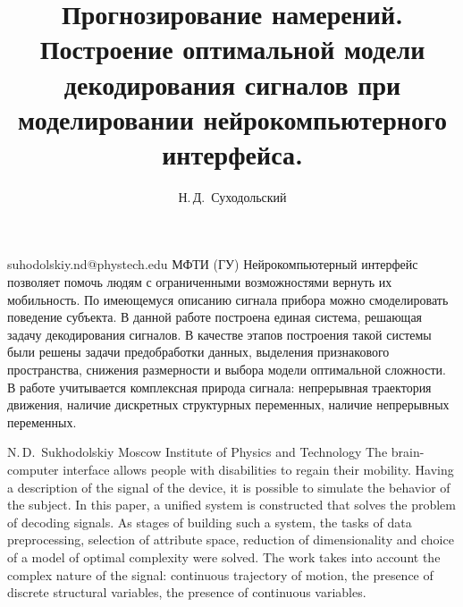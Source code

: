 \documentclass[12pt,twoside]{article}
\begin{document}
\title
    {Прогнозирование намерений. Построение оптимальной модели декодирования сигналов при моделировании нейрокомпьютерного интерфейса.}
\author
    {Н.\,Д.~Суходольский} 
\email
    {suhodolskiy.nd@phystech.edu}
\organization
    {МФТИ (ГУ)}
\abstract
    {Нейрокомпьютерный интерфейс позволяет помочь людям с ограниченными возможностями вернуть их мобильность. По имеющемуся описанию сигнала прибора можно смоделировать поведение субъекта. В данной работе построена единая система, решающая задачу декодирования сигналов. В качестве этапов построения такой системы были решены задачи предобработки данных, выделения признакового пространства, снижения размерности и выбора модели оптимальной сложности. В работе учитывается комплексная природа сигнала: непрерывная траектория движения, наличие дискретных структурных переменных, наличие непрерывных переменных.}

\authorEng
		{N.\,D.~Sukhodolskiy}
\organizationEng
		{Moscow Institute of Physics and Technology}
\abstractEng
		{The brain-computer interface allows people with disabilities to regain their mobility. Having a description of the signal of the device, it is possible to simulate the behavior of the subject. In this paper, a unified system is constructed that solves the problem of decoding signals. As stages of building such a system, the tasks of data preprocessing, selection of attribute space, reduction of dimensionality and choice of a model of optimal complexity were solved. The work takes into account the complex nature of the signal: continuous trajectory of motion, the presence of discrete structural variables, the presence of continuous variables.}

\maketitle
\end{document}
